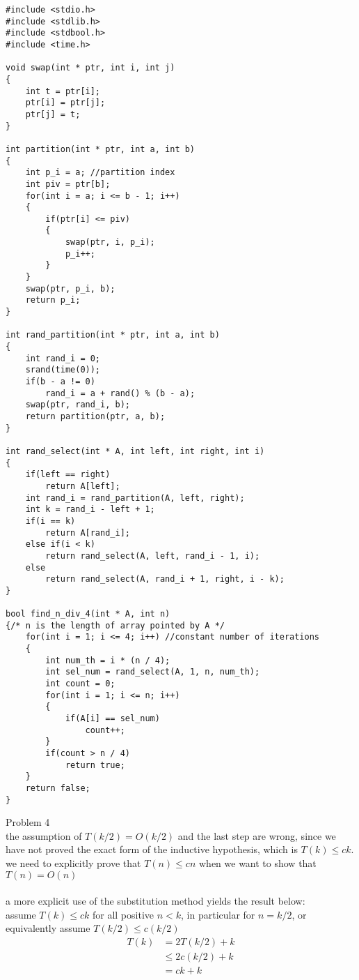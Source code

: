 \documentclass[12pt,border=4pt,multi]{article}%
\begin{document}
\begin{lstlisting}
#include <stdio.h>
#include <stdlib.h>
#include <stdbool.h>
#include <time.h>

void swap(int * ptr, int i, int j)
{
    int t = ptr[i];
    ptr[i] = ptr[j];
    ptr[j] = t;
}

int partition(int * ptr, int a, int b)
{
    int p_i = a; //partition index
    int piv = ptr[b];
    for(int i = a; i <= b - 1; i++)
    {
        if(ptr[i] <= piv)
        {
            swap(ptr, i, p_i);
            p_i++;
        }
    }
    swap(ptr, p_i, b);
    return p_i; 
}

int rand_partition(int * ptr, int a, int b)
{
    int rand_i = 0;
    srand(time(0));
    if(b - a != 0) 
        rand_i = a + rand() % (b - a);
    swap(ptr, rand_i, b);
    return partition(ptr, a, b);
}

int rand_select(int * A, int left, int right, int i)
{
    if(left == right)
        return A[left];
    int rand_i = rand_partition(A, left, right);
    int k = rand_i - left + 1;
    if(i == k)
        return A[rand_i];
    else if(i < k)
        return rand_select(A, left, rand_i - 1, i);
    else
        return rand_select(A, rand_i + 1, right, i - k);
}

bool find_n_div_4(int * A, int n)
{/* n is the length of array pointed by A */
    for(int i = 1; i <= 4; i++) //constant number of iterations
    {
        int num_th = i * (n / 4);
        int sel_num = rand_select(A, 1, n, num_th);
        int count = 0;
        for(int i = 1; i <= n; i++)
        {
            if(A[i] == sel_num)
                count++;
        }
        if(count > n / 4)
            return true;
    }
    return false;
}
\end{lstlisting}
\newpage
\noindent
Problem 4\\
the assumption of $T(k/2) = O(k/2)$ and the last step are wrong, since we have not proved the exact form of the inductive hypothesis, which is $T(k) \leq ck$. we need to explicitly prove
that $T(n) \leq cn$ when we want to show that $T(n) = O(n)$\\
\\
a more explicit use of the substitution method yields the result below:\\
assume $T(k) \leq ck$ for all positive $n < k$, in particular for $n = k / 2$, or equivalently assume $T(k / 2) \leq c(k / 2)$\\
\begin{align*}
T(k) &= 2T(k / 2) + k\\
&\leq 2c(k / 2) + k\\
&= ck + k\\
\end{align*}
\end{document}
